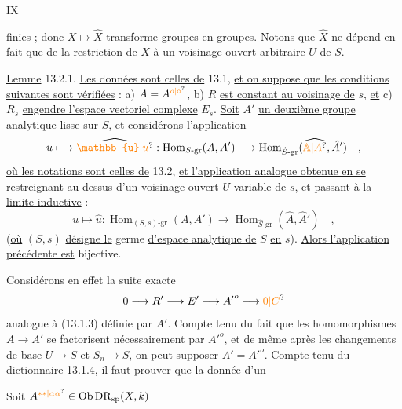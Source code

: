 \makeatletter\tagsleft@true\makeatother{}\hfill IX

finies ; donc $X\longmapsto\hat X$ transforme groupes en groupes. Notons que $\hat X$ ne dépend en fait que de la restriction de $X$ à un voisinage ouvert arbitraire $U$ de $S$.

\uline{Lemme} 13.2.1. \uline{Les données sont celles de} 13.1, \uline{et on suppose que les conditions suivantes sont vérifiées} : a) $A=A^{\unsure{o|\circ}}$, b) $R$ \uline{est constant au voisinage de} $s$, \uline{et} c) $R_s$ \uline{engendre l'espace vectoriel complexe} $E_s$. \uline{Soit} $A'$ \uline{un deuxième groupe analytique lisse sur} $S$, \uline{et considérons l'application}
\[
 u\longmapsto\widehat{\unsure{\mathbb{u}|u}}:\operatorname{Hom}_{S\text{-}\mathrm{gr}}(A,A')\longrightarrow\operatorname{Hom}_{\hat S\text{-}\mathrm{gr}}(\widehat{\unsure{\mathbb A|A}},\hat A')\quad,
\]
\uline{où les notations sont celles de} 13.2, \uline{et l'application analogue obtenue en se restreignant au-dessus d'un voisinage ouvert} $U$ \uline{variable de} $s$, \uline{et passant à la limite inductive} :
\[
 u\longmapsto\hat u:\operatorname{Hom}_{(S,s)\text{-}\mathrm{gr}}(A,A')\longrightarrow\operatorname{Hom}_{\hat S\text{-}\mathrm{gr}}(\hat A,\hat A')\quad,
 \tag*{(13.2.1.1)}
\]
(\uline{où} $(S,s)$ \uline{désigne le} germe \uline{d'espace analytique de} $S$ \uline{en} $s$). \uline{Alors l'application précédente est} bijective.

Considérons en effet la suite exacte
\[
 0\longrightarrow R'\longrightarrow E'\longrightarrow {A'}^{o}\longrightarrow\unsure{0|C}
\]
analogue à (13.1.3) définie par $A'$. Compte tenu du fait que les homomorphismes $A\longrightarrow A'$ se factorisent nécessairement par $ {A'}^{o}$, et de même après les changements de base $U\longrightarrow S$ et $S_n\longrightarrow S$, on peut supposer $A'={A'}^{o}$. Compte tenu du dictionnaire 13.1.4, il faut prouver que la donnée d'un

Soit $A^{\unsure{**|\alpha\alpha}}\in\operatorname{Ob}\mathrm{DR}_{\mathrm{sp}}(X,k)$

